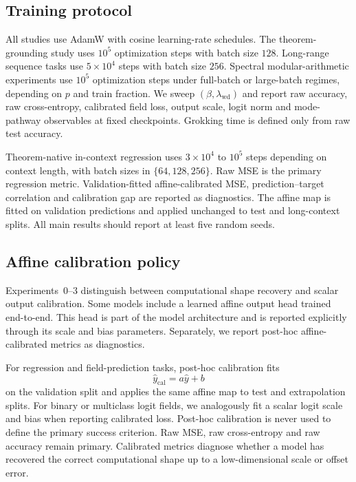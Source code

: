\documentclass[11pt]{article}
\theoremstyle{definition}
\begin{document}
\subsection*{Training protocol}

All studies use AdamW with cosine learning-rate schedules. The theorem-grounding study uses \(10^5\) optimization steps with batch size \(128\). Long-range sequence tasks use \(5\times 10^4\) steps with batch size \(256\). Spectral modular-arithmetic experiments use \(10^5\) optimization steps under full-batch or large-batch regimes, depending on \(p\) and train fraction. We sweep \((\beta,\lambda_{\mathrm{wd}})\) and report raw accuracy, raw cross-entropy, calibrated field loss, output scale, logit norm and mode-pathway observables at fixed checkpoints. Grokking time is defined only from raw test accuracy.

Theorem-native in-context regression uses \(3\times 10^4\) to \(10^5\) steps depending on context length, with batch sizes in \(\{64,128,256\}\). Raw MSE is the primary regression metric. Validation-fitted affine-calibrated MSE, prediction--target correlation and calibration gap are reported as diagnostics. The affine map is fitted on validation predictions and applied unchanged to test and long-context splits. All main results should report at least five random seeds.

\subsection*{Affine calibration policy}

Experiments~0--3 distinguish between computational shape recovery and scalar output calibration. Some models include a learned affine output head trained end-to-end. This head is part of the model architecture and is reported explicitly through its scale and bias parameters. Separately, we report post-hoc affine-calibrated metrics as diagnostics.

For regression and field-prediction tasks, post-hoc calibration fits
\begin{equation}
\hat y_{\mathrm{cal}} = a\hat y+b
\end{equation}
on the validation split and applies the same affine map to test and extrapolation splits. For binary or multiclass logit fields, we analogously fit a scalar logit scale and bias when reporting calibrated loss. Post-hoc calibration is never used to define the primary success criterion. Raw MSE, raw cross-entropy and raw accuracy remain primary. Calibrated metrics diagnose whether a model has recovered the correct computational shape up to a low-dimensional scale or offset error.
\end{document}
